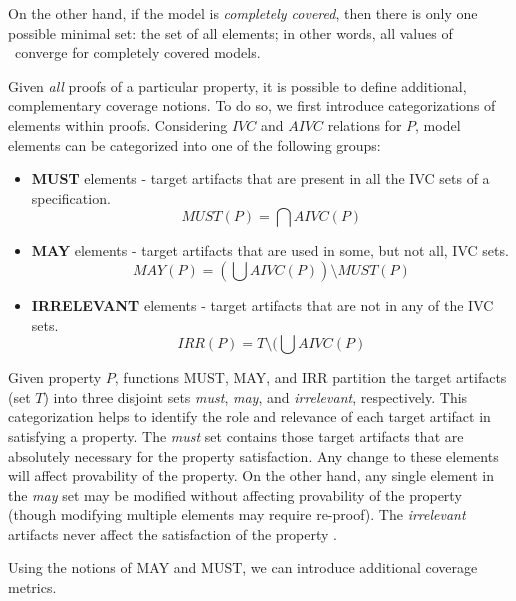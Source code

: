 \noindent On the other hand, if the model is {\em completely covered}, then there is only one possible minimal set: the set of all elements; in other words, all values of \ivccov\ converge for completely covered models.

Given {\em all} proofs of a particular property, it is possible to define additional, complementary coverage notions.  To do so, we first introduce categorizations of elements within proofs.
%
Considering $IVC$ and $AIVC$ relations for $P$, model elements can be categorized into one of the following groups:

\begin{itemize}
  \item \textbf{MUST} elements - target artifacts that are present in all the IVC sets of a specification.
      \[
      MUST (P) = \bigcap AIVC(P)
      \]

  \item \textbf{MAY} elements - target artifacts that are used in some, but not all, IVC sets.
      \[
      MAY(P) = (\bigcup AIVC (P)) \setminus MUST (P)
      \]

  \item \textbf{IRRELEVANT} elements - target artifacts that are not in any of the IVC sets.
  $$IRR(P) = T \setminus (\bigcup AIVC (P)$$
\end{itemize}

Given property $P$, functions MUST, MAY, and IRR partition the target artifacts (set $T$) into three disjoint sets \emph{must}, \emph{may}, and \emph{irrelevant}, respectively. This categorization helps to identify the role and relevance of each target artifact in satisfying a property. The \emph{must} set contains those target artifacts that are absolutely necessary for the property satisfaction.  Any change to these elements will affect provability of the property. On the other hand, any single element in the \emph{may} set may be modified without affecting provability of the property (though modifying multiple elements may require re-proof).   The \emph{irrelevant} artifacts never affect the satisfaction of the property \cite{Murugesan16:renext}.


Using the notions of MAY and MUST, we can introduce additional coverage metrics.

